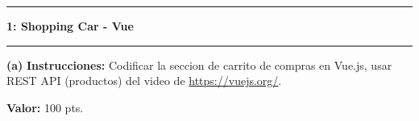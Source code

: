 \documentclass[11pt]{article}
\newcommand\question[2]{\vspace{.25in}\hrule\textbf{#1: #2}\vspace{.5em}\hrule\vspace{.10in}}
\renewcommand\part[1]{\vspace{.10in}\textbf{(#1)}}
\newcommand\algorithm{\vspace{.10in}\textbf{Instrucciones: }}
\newcommand\correctness{\vspace{.10in}\textbf{Valor: }}
\begin{document}
\raggedright

\newcommand\NAME{Adolfo Centeno}  
\newcommand\ADSOFTID{adsoft}     
\newcommand\HWNUM{5}              

\question{1}{Shopping Car - Vue} 

\part{a} \algorithm  Codificar la seccion de carrito de compras en Vue.js, usar REST API (productos) del video de \url{https://vuejs.org/}.

\correctness 100 pts.
\end{document}
